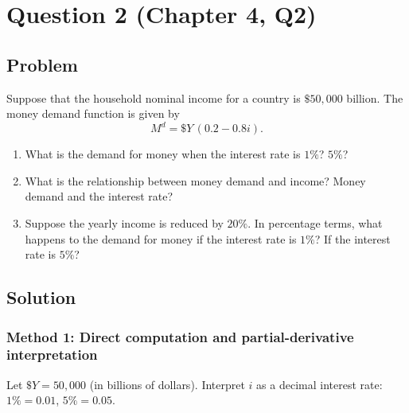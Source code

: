 \documentclass[12pt]{article}
\begin{document}
\newpage

\section*{Question 2 (Chapter 4, Q2)}
\subsection*{Problem}
Suppose that the household nominal income for a country is \(\$50{,}000\) billion. The money demand function is given by
\[
M^d = \$Y\,(0.2 - 0.8i).
\]
\begin{enumerate}[label=(\alph*)]
  \item What is the demand for money when the interest rate is \(1\%\)? \(5\%\)?
  \item What is the relationship between money demand and income? Money demand and the interest rate?
  \item Suppose the yearly income is reduced by \(20\%\). In percentage terms, what happens to the demand for money if the interest rate is \(1\%\)? If the interest rate is \(5\%\)?
\end{enumerate}

\subsection*{Solution}

\subsubsection*{Method 1: Direct computation and partial-derivative interpretation}
Let \(\$Y=50{,}000\) (in billions of dollars). Interpret \(i\) as a decimal interest rate: \(1\%=0.01\), \(5\%=0.05\).
\end{document}
